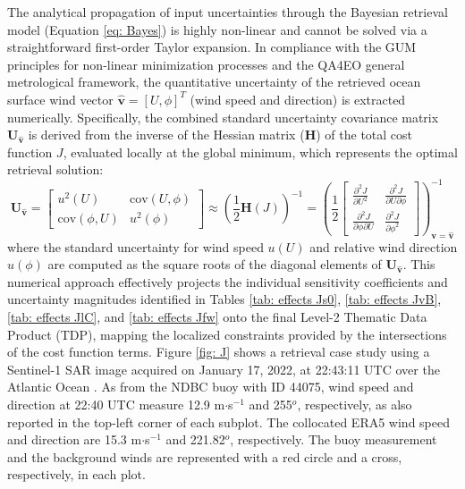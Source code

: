 The analytical propagation of input uncertainties through the Bayesian retrieval model (Equation \ref{eq: Bayes}) is highly non-linear and cannot be solved via a straightforward first-order Taylor expansion. 
In compliance with the GUM principles for non-linear minimization processes and the QA4EO general metrological framework, the quantitative uncertainty of the retrieved ocean surface wind vector \(\hat{\mathbf{v}} = [U, \phi]^T\) (wind speed and direction) is extracted numerically. Specifically, the combined standard uncertainty covariance matrix 
\(\mathbf{U}_{{\mathbf{\hat{v}}}}\) is derived from the inverse of the Hessian matrix (\(\mathbf{H}\)) of the total cost function \(J\), evaluated locally at the global minimum, which represents the optimal retrieval solution:
\begin{equation}
\mathbf{U}_{{\mathbf{\hat{v}}}}=\left[\begin{matrix}u^{2}(U)&\text{cov}(U,\phi )\\ \text{cov}(\phi ,U)&u^{2}(\phi )\end{matrix}\right]\approx \left(\frac{1}{2}\mathbf{H}(J)\right)^{-1}=\left(\frac{1}{2}\left[\begin{matrix}\frac{\partial ^{2}J}{\partial U^{2}}&\frac{\partial ^{2}J}{\partial U\partial \phi }\\ \frac{\partial ^{2}J}{\partial \phi \partial U}&\frac{\partial ^{2}J}{\partial \phi ^{2}}\end{matrix}\right]\right)_{\mathbf{v}={\mathbf{\hat{v}}}}^{-1}
\end{equation}
where the standard uncertainty for wind speed \(u(U)\) and relative wind direction \(u(\phi)\) are computed as the square roots of the diagonal elements of \(\mathbf{U}_{{\mathbf{\hat{v}}}}\). This numerical approach effectively projects the individual sensitivity coefficients and uncertainty magnitudes identified in Tables \ref{tab: effects Js0}, \ref{tab: effects JvB}, \ref{tab: effects JlC}, and \ref{tab: effects Jfw} onto the final Level-2 Thematic Data Product (TDP), mapping the localized constraints provided by the intersections of the cost function terms.
Figure \ref{fig: J} shows a retrieval case study using a Sentinel-1 \ac{SAR}
image acquired on January 17, 2022, at 22:43:11 UTC over the Atlantic Ocean
\cite{ZhuIGARSS2025}. As from the \ac{NDBC} buoy with ID
44075, wind speed and direction at 22:40 UTC measure 12.9 m$\cdot$s$^{-1}$ and
255$^{o}$, respectively, as also reported in the top-left corner of each
subplot. The collocated \ac{ERA5} wind speed and direction are
15.3 m$\cdot$s$^{-1}$ and 221.82$^{o}$, respectively. The buoy measurement and the
background winds are represented with a red circle and a cross, respectively,
in each plot.

